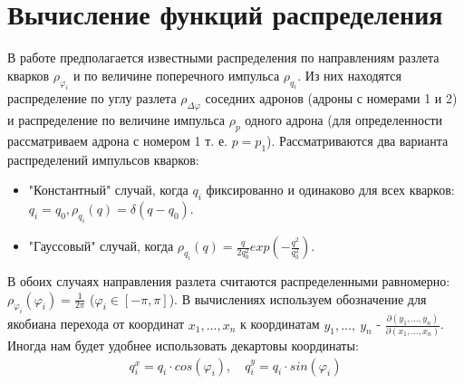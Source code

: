 \documentclass[12pt]{article}
\renewcommand{\l}{\left( }
\renewcommand{\r}{\right) }
\renewcommand{\phi}{\varphi}
\newcommand{\pd}{\partial}
\newcommand{\br}[1]{\l {#1} \r}
\newcommand{\jacobian}[2]{\frac{\pd \br{#1}}{\pd \br{#2}}}
\begin{document}
\section{Вычисление функций распределения}
В работе предполагается известными распределения по направлениям разлета кварков $\rho_{\phi_i}$ и по величине поперечного импульса $\rho_{q_i}$. Из них находятся распределение по углу разлета $\rho_{\Delta \phi}$ соседних адронов (адроны с номерами 1 и 2) и распределение по величине импульса $\rho_p$ одного адрона (для определенности рассматриваем адрона с номером 1 т. е. $p = p_1$). Рассматриваются два варианта распределений импульсов кварков:
\begin{itemize}
\item "Константный" случай, когда $q_i$ фиксированно и одинаково для всех кварков: $q_i = q_0, \rho_{q_i} \br{q} = \delta \br{q - q_0}$.
\item "Гауссовый" случай, когда $\rho_{q_i} \br{q} = \frac{q}{2 q_0^2} exp \br{-\frac{q^2}{q_0^2} }$.
\end{itemize}
В обоих случаях направления разлета считаются распределенными равномерно: \newline $\rho_{\phi_i} \br{\phi_i} = \frac{1}{2\pi}$ ($\phi_i \in \left[ -\pi, \pi \right]$). В вычислениях используем обозначение для якобиана перехода от координат $x_1,\ldots , x_n$ к координатам $y_1,\ldots ,\ y_n$ - $\jacobian{y_1,\ldots , y_n}{x_1,\ldots , x_n}$. Иногда нам будет удобнее использовать декартовы координаты:
\begin{gather}
q_i^x = q_i \cdot cos \l \phi_i \r,\quad q_i^y = q_i \cdot sin \br{ \phi_i}
\end{gather}
\end{document}
